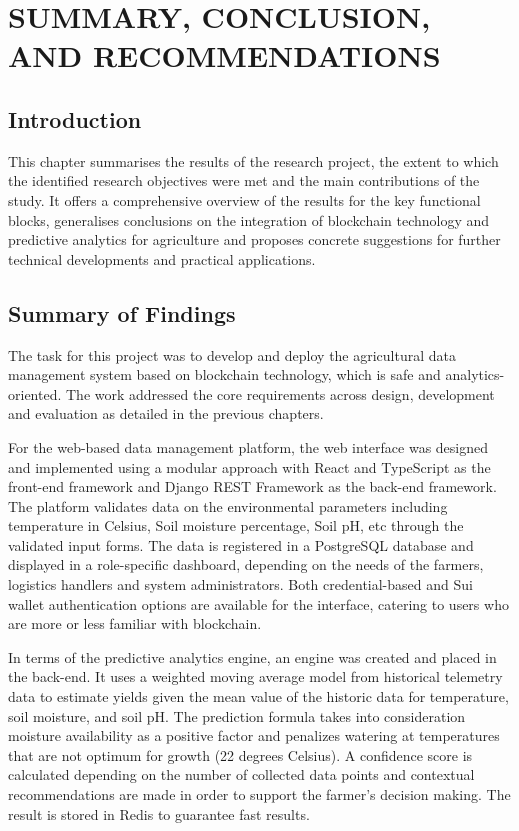 \chapter{SUMMARY, CONCLUSION, AND RECOMMENDATIONS}

\section{Introduction}

This chapter summarises the results of the research project, the extent to which the identified research objectives were met and the main contributions of the study. It offers a comprehensive overview of the results for the key functional blocks, generalises conclusions on the integration of blockchain technology and predictive analytics for agriculture and proposes concrete suggestions for further technical developments and practical applications.

\section{Summary of Findings}

The task for this project was to develop and deploy the agricultural data management system based on blockchain technology, which is safe and analytics-oriented. The work addressed the core requirements across design, development and evaluation as detailed in the previous chapters.

For the web-based data management platform, the web interface was designed and implemented using a modular approach with React and TypeScript as the front-end framework and Django REST Framework as the back-end framework. The platform validates data on the environmental parameters including temperature in Celsius, Soil moisture percentage, Soil pH, etc through the validated input forms. The data is registered in a PostgreSQL database and displayed in a role-specific dashboard, depending on the needs of the farmers, logistics handlers and system administrators. Both credential-based and Sui wallet authentication options are available for the interface, catering to users who are more or less familiar with blockchain.

In terms of the predictive analytics engine, an engine was created and placed in the back-end. It uses a weighted moving average model from historical telemetry data to estimate yields given the mean value of the historic data for temperature, soil moisture, and soil pH. The prediction formula takes into consideration moisture availability as a positive factor and penalizes watering at temperatures that are not optimum for growth (22 degrees Celsius). A confidence score is calculated depending on the number of collected data points and contextual recommendations are made in order to support the farmer's decision making. The result is stored in Redis to guarantee fast results.

